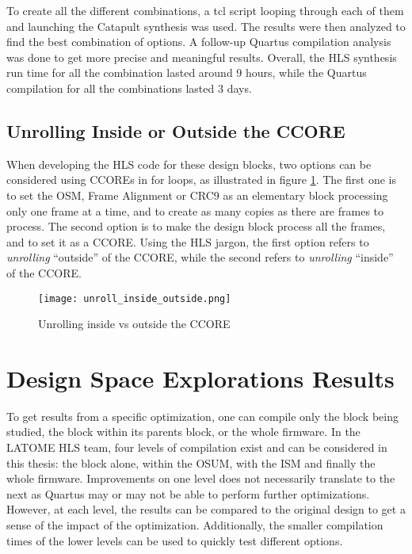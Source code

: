 To create all the different combinations, a tcl script looping through each of them and launching the Catapult synthesis was used. The results were then analyzed to find the best combination of options. A follow-up Quartus compilation analysis was done to get more precise and meaningful results. Overall, the HLS synthesis run time for all the combination lasted around 9 hours, while the Quartus compilation for all the combinations lasted 3 days.

\subsection{Unrolling Inside or Outside the CCORE}

When developing the HLS code for these design blocks, two options can be considered using CCOREs in for loops, as illustrated in figure \ref{fig:unrolling-inside-outside}. The first one is to set the OSM, Frame Alignment or CRC9 as an elementary block processing only one frame at a time, and to create as many copies as there are frames to process. The second option is to make the design block process all the frames, and to set it as a CCORE. Using the HLS jargon, the first option refers to \textit{unrolling} ``outside'' of the CCORE, while the second refers to \textit{unrolling} ``inside'' of the CCORE.

\begin{figure}
    \centering
    \texttt{[image: unroll\_inside\_outside.png]}
    \caption{Unrolling inside vs outside the CCORE}
    \label{fig:unrolling-inside-outside}
\end{figure}


\section{Design Space Explorations Results}

To get results from a specific optimization, one can compile only the block being studied, the block within its parents block, or the whole firmware. In the LATOME HLS team, four levels of compilation exist and can be considered in this thesis: the block alone, within the OSUM, with the ISM and finally the whole firmware. Improvements on one level does not necessarily translate to the next as Quartus may or may not be able to perform further optimizations. However, at each level, the results can be compared to the original design to get a sense of the impact of the optimization. Additionally, the smaller compilation times of the lower levels can be used to quickly test different options.

